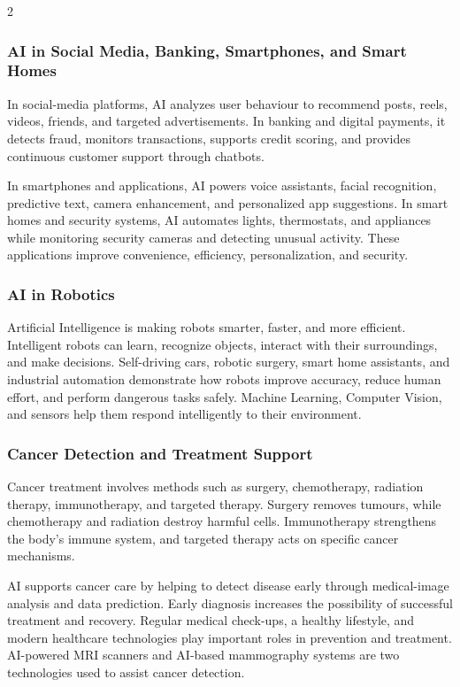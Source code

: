\begin{multicols}{2}
  \subsubsection*{AI in Social Media, Banking, Smartphones, and Smart Homes}
  In social-media platforms, AI analyzes user behaviour to recommend posts, reels, videos, friends, and targeted advertisements. In banking and digital payments, it detects fraud, monitors transactions, supports credit scoring, and provides continuous customer support through chatbots.

  \noindent
  In smartphones and applications, AI powers voice assistants, facial recognition, predictive text, camera enhancement, and personalized app suggestions. In smart homes and security systems, AI automates lights, thermostats, and appliances while monitoring security cameras and detecting unusual activity. These applications improve convenience, efficiency, personalization, and security.

  \subsubsection*{AI in Robotics}
  {\justifying Artificial Intelligence is making robots smarter, faster, and more efficient. Intelligent robots can learn, recognize objects, interact with their surroundings, and make decisions. Self-driving cars, robotic surgery, smart home assistants, and industrial automation demonstrate how robots improve accuracy, reduce human effort, and perform dangerous tasks safely. Machine Learning, Computer Vision, and sensors help them respond intelligently to their environment.\par}

  \subsubsection*{Cancer Detection and Treatment Support}
  Cancer treatment involves methods such as surgery, chemotherapy, radiation therapy, immunotherapy, and targeted therapy. Surgery removes tumours, while chemotherapy and radiation destroy harmful cells. Immunotherapy strengthens the body's immune system, and targeted therapy acts on specific cancer mechanisms.

  \noindent
  AI supports cancer care by helping to detect disease early through medical-image analysis and data prediction. Early diagnosis increases the possibility of successful treatment and recovery. Regular medical check-ups, a healthy lifestyle, and modern healthcare technologies play important roles in prevention and treatment. AI-powered MRI scanners and AI-based mammography systems are two technologies used to assist cancer detection.


\end{multicols}
